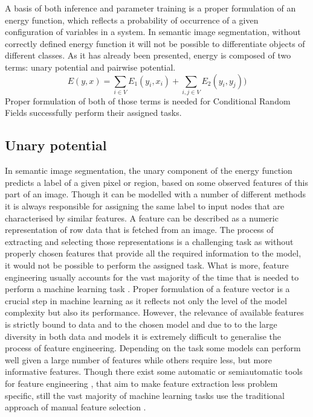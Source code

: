 A basis of both inference and parameter training is a proper formulation of an energy function, which reflects a probability of occurrence of a given configuration of variables in a system. In semantic image segmentation, without correctly defined energy function it will not be possible to differentiate objects of different classes. As it has already been presented, energy is composed of two terms: unary potential and pairwise potential. 
\begin{equation}
    E(y,x) = \sum_{i \in V}{E_1(y_i,x_i)} +  \sum_{i,j \in V}{E_2(y_i,y_j)})
\end{equation}
Proper formulation of both of those terms is needed for Conditional Random Fields successfully perform their assigned tasks. 

\subsection{Unary potential}

In semantic image segmentation, the unary component of the energy function predicts a label of a given pixel or region, based on some observed features of this part of an image. Though it can be modelled with a number of different methods it is always responsible for assigning the same label to input nodes that are characterised by similar features. A feature can be described as a numeric representation of row data that is fetched from an image. The process of extracting and selecting those representations is a challenging task as without properly chosen features that provide all the required information to the model, it would not be possible to perform the assigned task. What is more, feature engineering usually accounts for the vast majority of the time that is needed to perform a machine learning task \cite{features_oreilly}. Proper formulation of a feature vector is a crucial step in machine learning as it reflects not only the level of the model complexity but also its performance. However, the relevance of available features is strictly bound to data and to the chosen model and due to to the large diversity in both data and models it is extremely difficult to generalise the process of feature engineering. Depending on the task some models can perform well given a large number of features while others require less, but more informative features. Though there exist some automatic or semiautomatic tools for feature engineering \cite{python_h2o, python_tpot, python_auto-sklearn}, that aim to make feature extraction less problem specific, still the vast majority of machine learning tasks use the traditional approach of manual feature selection \cite{feature_engineering}. 

